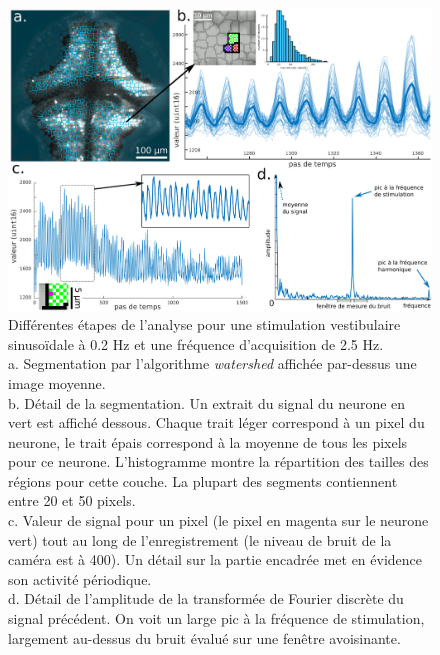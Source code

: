 \begin{figure}
    \centering
    \includegraphics[width=1\textwidth]{./files/analysis_illustration.svg.png}
    \caption{Différentes étapes de l'analyse pour une stimulation vestibulaire sinusoïdale à 0.2 Hz et une fréquence d'acquisition de 2.5 Hz.
    \\a. Segmentation par l'algorithme \emph{watershed} affichée par-dessus une image moyenne.
    \\b. Détail de la segmentation. Un extrait du signal du neurone en vert est affiché dessous. Chaque trait léger correspond à un pixel du neurone, le trait épais correspond à la moyenne de tous les pixels pour ce neurone. L'histogramme montre la répartition des tailles des régions pour cette couche. La plupart des segments contiennent entre 20 et 50 pixels.
    \\c. Valeur de signal pour un pixel (le pixel en magenta sur le neurone vert) tout au long de l'enregistrement (le niveau de bruit de la caméra est à 400). Un détail sur la partie encadrée met en évidence son activité périodique.
    \\d. Détail de l'amplitude de la transformée de Fourier discrète du signal précédent. On voit un large pic à la fréquence de stimulation, largement au-dessus du bruit évalué sur une fenêtre avoisinante.
    \label{FIGfourier}}
    \end{figure}    


